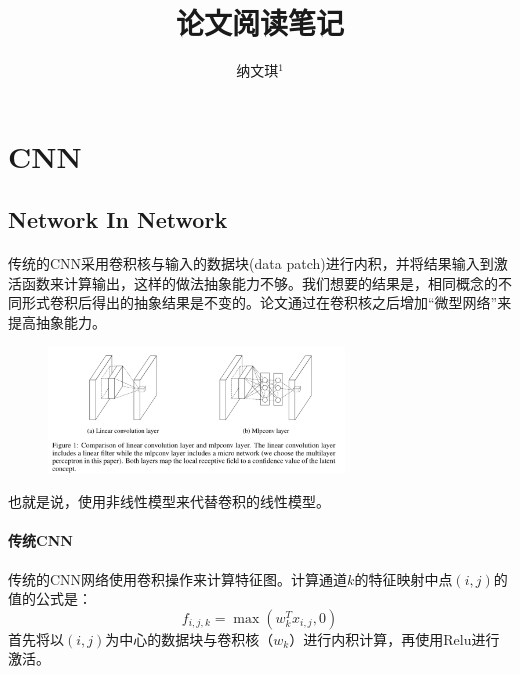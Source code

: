 \documentclass[10pt,letterpaper]{article}
\begin{document}
 


\title{论文阅读笔记}

\author{纳文琪$^{1}$}

\maketitle


\section{CNN}
\subsection{Network In Network\cite{networkinnetwor2013}}
\paragraph{} 传统的CNN采用卷积核与输入的数据块(data patch)进行内积，并将结果输入到激活函数来计算输出，这样的做法抽象能力不够。我们想要的结果是，相同概念的不同形式卷积后得出的抽象结果是不变的。论文通过在卷积核之后增加“微型网络”来提高抽象能力。
\begin{figure}[H] %
	\centering %
	\includegraphics[width=0.7\textwidth]{images/nin-1.png} %
	\caption{} %
	\label{Fig.main2} %
\end{figure}
也就是说，使用非线性模型来代替卷积的线性模型。
\paragraph{传统CNN} 传统的CNN网络使用卷积操作来计算特征图。计算通道$k$的特征映射中点$(i, j)$的值的公式是：
\begin{equation}
	f_{i,j,k} = \max(w_k^Tx_{i,j}, 0)
\end{equation}
首先将以$(i,j)$为中心的数据块与卷积核（$w_k$）进行内积计算，再使用Relu进行激活。
\end{document}
